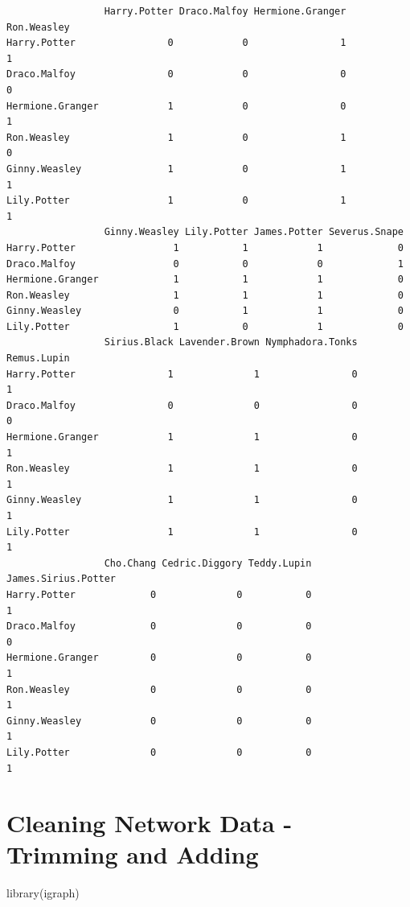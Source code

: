 \documentclass[
  letterpaper,
  DIV=11,
  numbers=noendperiod]{scrreprt}
\newenvironment{Shaded}{\begin{snugshade}}{\end{snugshade}}
\newcommand{\FunctionTok}[1]{\textcolor[rgb]{0.28,0.35,0.67}{#1}}
\newcommand{\NormalTok}[1]{\textcolor[rgb]{0.00,0.23,0.31}{#1}}
\begin{document}
\begin{verbatim}
                 Harry.Potter Draco.Malfoy Hermione.Granger Ron.Weasley
Harry.Potter                0            0                1           1
Draco.Malfoy                0            0                0           0
Hermione.Granger            1            0                0           1
Ron.Weasley                 1            0                1           0
Ginny.Weasley               1            0                1           1
Lily.Potter                 1            0                1           1
                 Ginny.Weasley Lily.Potter James.Potter Severus.Snape
Harry.Potter                 1           1            1             0
Draco.Malfoy                 0           0            0             1
Hermione.Granger             1           1            1             0
Ron.Weasley                  1           1            1             0
Ginny.Weasley                0           1            1             0
Lily.Potter                  1           0            1             0
                 Sirius.Black Lavender.Brown Nymphadora.Tonks Remus.Lupin
Harry.Potter                1              1                0           1
Draco.Malfoy                0              0                0           0
Hermione.Granger            1              1                0           1
Ron.Weasley                 1              1                0           1
Ginny.Weasley               1              1                0           1
Lily.Potter                 1              1                0           1
                 Cho.Chang Cedric.Diggory Teddy.Lupin James.Sirius.Potter
Harry.Potter             0              0           0                   1
Draco.Malfoy             0              0           0                   0
Hermione.Granger         0              0           0                   1
Ron.Weasley              0              0           0                   1
Ginny.Weasley            0              0           0                   1
Lily.Potter              0              0           0                   1
\end{verbatim}

\chapter{Cleaning Network Data - Trimming and
Adding}\label{cleaning-network-data---trimming-and-adding}

\begin{Shaded}
\begin{Highlighting}[]
\FunctionTok{library}\NormalTok{(igraph)}
\end{Highlighting}
\end{Shaded}
\end{document}
